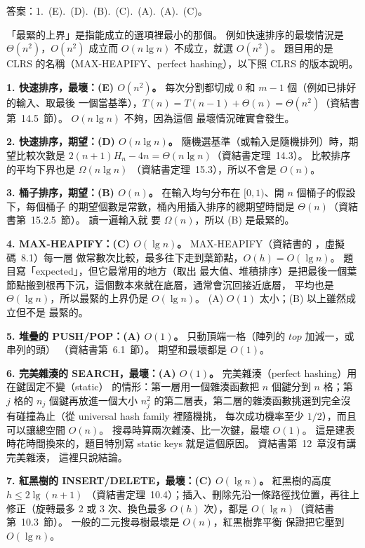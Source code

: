 \begin{pastsoln}
答案：1.~(E).~(D).~(B).~(C).~(A).~(A).~(C)。

「最緊的上界」是指能成立的選項裡最小的那個。 例如快速排序的最壞情況是 $\Theta(n^2)$，$O(n^2)$
成立而 $O(n \lg n)$ 不成立，就選 $O(n^2)$。 題目用的是 CLRS 的名稱（MAX-HEAPIFY、perfect
hashing），以下照 CLRS 的版本說明。

\textbf{1. 快速排序，最壞：(E) $O(n^2)$。} 每次分割都切成 $0$ 和 $m - 1$ 個（例如已排好的輸入、取最後
一個當基準），$T(n) = T(n-1) + \Theta(n) = \Theta(n^2)$（資結書第~14.5~節）。 $O(n \lg n)$ 不夠，因為這個
最壞情況確實會發生。

\textbf{2. 快速排序，期望：(D) $O(n \lg n)$。} 隨機選基準（或輸入是隨機排列）時，期望比較次數是
$2(n+1)H_n - 4n = \Theta(n \lg n)$（資結書定理~14.3）。 比較排序的平均下界也是 $\Omega(n \lg n)$
（資結書定理~15.3），所以不會是 $O(n)$。

\textbf{3. 桶子排序，期望：(B) $O(n)$。} 在輸入均勻分布在 $[0, 1)$、開 $n$ 個桶子的假設下，每個桶子
的期望個數是常數，桶內用插入排序的總期望時間是 $\Theta(n)$（資結書第~15.2.5~節）。 讀一遍輸入就
要 $\Omega(n)$，所以 (B) 是最緊的。

\textbf{4. MAX-HEAPIFY：(C) $O(\lg n)$。} MAX-HEAPIFY（資結書的 ，虛擬碼~8.1）每一層
做常數次比較，最多往下走到葉節點，$O(h) = O(\lg n)$。 題目寫「expected」，但它最常用的地方（取出
最大值、堆積排序）是把最後一個葉節點搬到根再下沉，這個數本來就在底層，通常會沉回接近底層，
平均也是 $\Theta(\lg n)$，所以最緊的上界仍是 $O(\lg n)$。 (A) $O(1)$ 太小；(B) 以上雖然成立但不是
最緊的。

\textbf{5. 堆疊的 PUSH/POP：(A) $O(1)$。} 只動頂端一格（陣列的 $\mathit{top}$ 加減一，或串列的頭）
（資結書第~6.1~節）。 期望和最壞都是 $O(1)$。

\textbf{6. 完美雜湊的 SEARCH，最壞：(A) $O(1)$。} 完美雜湊（perfect hashing）用在鍵固定不變（static）
的情形：第一層用一個雜湊函數把 $n$ 個鍵分到 $n$ 格；第 $j$ 格的 $n_j$ 個鍵再放進一個大小
$n_j^2$ 的第二層表，第二層的雜湊函數挑選到完全沒有碰撞為止（從 universal hash family 裡隨機挑，
每次成功機率至少 $1/2$），而且可以讓總空間 $O(n)$。 搜尋時算兩次雜湊、比一次鍵，最壞 $O(1)$。
這是建表時花時間換來的，題目特別寫 static keys 就是這個原因。 資結書第~12~章沒有講完美雜湊，
這裡只說結論。

\textbf{7. 紅黑樹的 INSERT/DELETE，最壞：(C) $O(\lg n)$。} 紅黑樹的高度 $h \le 2 \lg(n + 1)$
（資結書定理~10.4）；插入、刪除先沿一條路徑找位置，再往上修正（旋轉最多 $2$ 或 $3$ 次、換色最多
$O(h)$ 次），都是 $O(\lg n)$（資結書第~10.3~節）。 一般的二元搜尋樹最壞是 $O(n)$，紅黑樹靠平衡
保證把它壓到 $O(\lg n)$。
\end{pastsoln}
